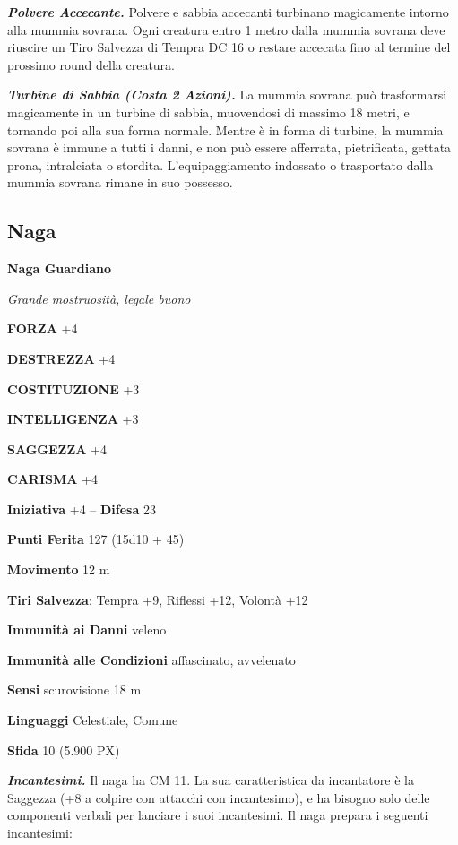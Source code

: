 \begin{multicols}{2}
	\textit{\textbf{Polvere Accecante.}} Polvere e sabbia accecanti turbinano magicamente intorno alla mummia sovrana. Ogni creatura entro 1 metro dalla mummia sovrana deve riuscire un Tiro Salvezza di Tempra DC 16 o restare accecata fino al termine del prossimo round della creatura.

	\textit{\textbf{Turbine di Sabbia (Costa 2 Azioni).}} La mummia sovrana può trasformarsi magicamente in un turbine di sabbia, muovendosi di massimo 18 metri, e tornando poi alla sua forma normale. Mentre è in forma di turbine, la mummia sovrana è immune a tutti i danni, e non può essere afferrata, pietrificata, gettata prona, intralciata o stordita. L'equipaggiamento indossato o trasportato dalla mummia sovrana rimane in suo possesso.

	\subsection{Naga}

	\medskip{}\textbf{Naga Guardiano}

	\textit{Grande mostruosità, legale buono}

	\textbf{FORZA} +4

	\textbf{DESTREZZA} +4

	\textbf{COSTITUZIONE} +3

	\textbf{INTELLIGENZA} +3

	\textbf{SAGGEZZA} +4

	\textbf{CARISMA} +4

	\textbf{Iniziativa} +4 -- \textbf{Difesa} 23

	\textbf{Punti Ferita} 127 (15d10 + 45)

	\textbf{Movimento} 12 m

	\textbf{Tiri Salvezza}: Tempra +9, Riflessi +12, Volontà +12

	\textbf{Immunità ai Danni} veleno

	\textbf{Immunità alle Condizioni} affascinato, avvelenato

	\textbf{Sensi} scurovisione 18 m

	\textbf{Linguaggi} Celestiale, Comune

	\textbf{Sfida} 10 (5.900 PX)

	\textit{\textbf{Incantesimi.}} Il naga ha CM 11. La sua caratteristica da incantatore è la Saggezza (+8 a colpire con attacchi con incantesimo), e ha bisogno solo delle componenti verbali per lanciare i suoi incantesimi. Il naga prepara i seguenti incantesimi:


\end{multicols}

